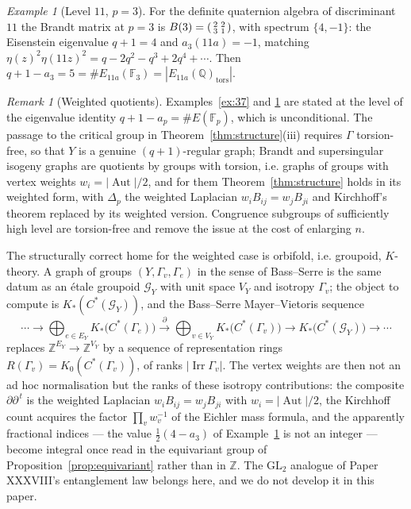 \documentclass[11pt]{amsart}
\numberwithin{equation}{section}
\theoremstyle{definition}
\theoremstyle{remark}
\newtheorem{remark}[theorem]{Remark}
\newtheorem{example}[theorem]{Example}
\newcommand{\Z}{\mathbb{Z}}
\newcommand{\Q}{\mathbb{Q}}
\newcommand{\F}{\mathbb{F}}
\newcommand{\cG}{\mathcal{G}}
\newcommand{\Irr}{\operatorname{Irr}}
\newcommand{\Aut}{\operatorname{Aut}}
\newcommand{\GL}{\mathrm{GL}}
\begin{document}
\begin{example}[Level $11$, $p=3$]\label{ex:11}
For the definite quaternion algebra of discriminant $11$ the Brandt matrix at $p=3$ is
$B(3)=\begin{psmallmatrix}2&2\\3&1\end{psmallmatrix}$, with spectrum $\{4,-1\}$: the
Eisenstein eigenvalue $q+1=4$ and $a_3(11a)=-1$, matching
$\eta(z)^2\eta(11z)^2=q-2q^2-q^3+2q^4+\cdots$. Then
$q+1-a_3=5=\#E_{11a}(\F_3)=|E_{11a}(\Q)_{\mathrm{tors}}|$.
\end{example}

\begin{remark}[Weighted quotients]\label{rem:weights}
Examples~\ref{ex:37} and \ref{ex:11} are stated at the level of the eigenvalue identity
$q+1-a_p=\#E(\F_p)$, which is unconditional. The passage to the critical group in
Theorem~\ref{thm:structure}(iii) requires $\Gamma$ torsion-free, so that $Y$ is a genuine
$(q+1)$-regular graph; Brandt and supersingular isogeny graphs are quotients by groups
with torsion, i.e. graphs of groups with vertex weights $w_i=|\Aut|/2$, and for them
Theorem~\ref{thm:structure} holds in its weighted form, with $\Delta_p$ the weighted
Laplacian $w_iB_{ij}=w_jB_{ji}$ and Kirchhoff's theorem replaced by its weighted
version. Congruence subgroups of sufficiently high level are torsion-free and remove the
issue at the cost of enlarging $n$.

The structurally correct home for the weighted case is orbifold, i.e. groupoid,
$K$-theory. A graph of groups $(Y,\Gamma_v,\Gamma_e)$ in the sense of Bass--Serre is the
same datum as an \'etale groupoid $\cG_{Y}$ with unit space $V_Y$ and isotropy
$\Gamma_v$; the object to compute is $K_*(C^*(\cG_Y))$, and the Bass--Serre
Mayer--Vietoris sequence
\[
\cdots\to\bigoplus_{e\in E_Y}K_*\bigl(C^*(\Gamma_e)\bigr)
\xrightarrow{\ \partial\ }\bigoplus_{v\in V_Y}K_*\bigl(C^*(\Gamma_v)\bigr)
\to K_*\bigl(C^*(\cG_Y)\bigr)\to\cdots
\]
replaces $\Z^{E_Y}\to\Z^{V_Y}$ by a sequence of representation rings
$R(\Gamma_v)=K_0(C^*(\Gamma_v))$, of ranks $|\Irr\Gamma_v|$. The vertex weights are then
not an ad hoc normalisation but the ranks of these isotropy contributions: the composite
$\partial\partial^{\,t}$ is the weighted Laplacian $w_iB_{ij}=w_jB_{ji}$ with
$w_i=|\Aut|/2$, the Kirchhoff count acquires the factor $\prod_vw_v^{-1}$ of the
Eichler mass formula, and the apparently fractional indices --- the value
$\tfrac12(4-a_3)$ of Example~\ref{ex:11} is not an integer --- become integral once read
in the equivariant group of Proposition~\ref{prop:equivariant} rather than in $\Z$. The
$\GL_2$ analogue of Paper XXXVIII's entanglement law belongs here, and we do not develop
it in this paper.
\end{remark}
\end{document}
